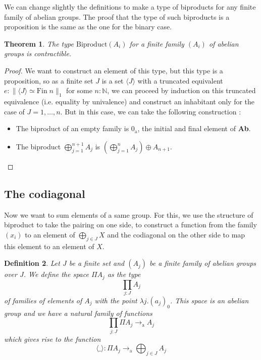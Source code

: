 \documentclass{article}
\newtheorem{defi}{Definition}
\newtheorem{them}[defi]{Theorem}
\newcommand{\toa}[0]{\to_\mathrm a}
\begin{document}
We can change slightly the definitions to make a type of biproducts for any finite family of abelian groups.
The proof that the type of such biproducts is a proposition is the same as the one for the binary case.

\begin{them}
    The type $\mathrm{Biproduct} (A_i)$ for a finite family $(A_i)$ of abelian groups is contractible.
\end{them}

\begin{proof}
    We want to construct an element of this type, but this type is a proposition, so as a finite set $J$ is a
    set $\langle J \rangle$ with a truncated equivalent $e : \|\langle J \rangle \simeq \mathrm{Fin}\;n\|_1$
    for some $n : \mathbb N$, we can proceed by induction on this truncated equivalence (i.e. equality by
    univalence) and construct an inhabitant only for the case of $J = 1,\ldots,n$. But in this case, we can
    take the following construction :
    \begin{itemize}
        \item The biproduct of an empty family is $0_\mathrm a$, the initial and final element of \textbf{Ab}.
        \item The biproduct $\displaystyle\bigoplus_{j=1}^{n+1} A_j$ is $\displaystyle
        \left(\bigoplus_{j=1}^n A_j\right)\oplus A_{n+1}$.
    \end{itemize}
\end{proof}

\subsection{The codiagonal}

Now we want to sum elements of a same group. For this, we use the structure of biproduct to take the pairing
on one side, to construct a function from the family $(x_i)$ to an element of $\bigoplus_{j\in J} X$ and the
codiagonal on the other side to map this element to an element of $X$.

\begin{defi}
    Let $J$ be a finite set and $(A_j)$ be a finite family of abelian groups over $J$. We define the space
    $\Pi A_j$ as the type $$\prod_{j : J} A_j$$ of families of elements of $A_j$ with the point $\lambda j.
    (a_j)_0$. This space is an abelian group and we have a natural family of functions 
    $$\prod_{j : J}\Pi A_j \toa A_j$$ which gives rise to the function $$\langle\_\rangle :\Pi A_j \toa 
    \bigoplus_{j\in J} A_j$$
\end{defi}
\end{document}

